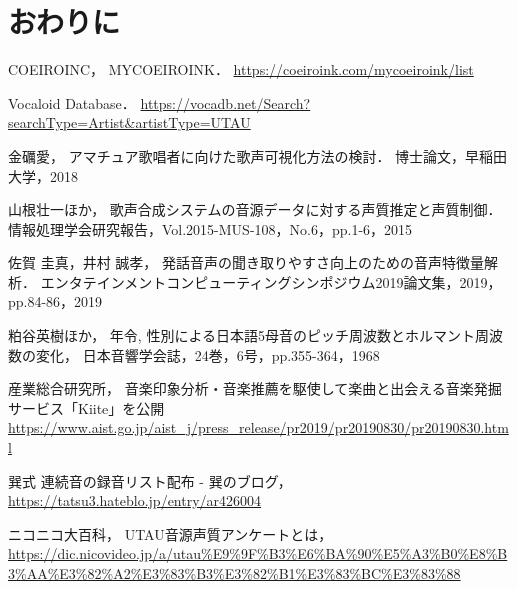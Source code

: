 \documentclass[a4j,8pt,twocolumn]{extarticle}
\begin{document}
\section{おわりに}

\begin{thebibliography}{9}
COEIROINC，
MYCOEIROINK．
\url{https://coeiroink.com/mycoeiroink/list}

Vocaloid Database．
\url{https://vocadb.net/Search?searchType=Artist&artistType=UTAU}

金礪愛，
アマチュア歌唱者に向けた歌声可視化方法の検討．
博士論文，早稲田大学，2018

山根壮一ほか，
歌声合成システムの音源データに対する声質推定と声質制御．
情報処理学会研究報告，Vol.2015-MUS-108，No.6，pp.1-6，2015

佐賀 圭真，井村 誠孝，
発話音声の聞き取りやすさ向上のための音声特徴量解析．
エンタテインメントコンピューティングシンポジウム2019論文集，2019，pp.84-86，2019

粕谷英樹ほか，
年令, 性別による日本語5母音のピッチ周波数とホルマント周波数の変化，
日本音響学会誌，24巻，6号，pp.355-364，1968

産業総合研究所，
音楽印象分析・音楽推薦を駆使して楽曲と出会える音楽発掘サービス「Kiite」を公開
\url{https://www.aist.go.jp/aist_j/press_release/pr2019/pr20190830/pr20190830.html}

巽式 連続音の録音リスト配布 - 巽のブログ，
\url{https://tatsu3.hateblo.jp/entry/ar426004}

ニコニコ大百科，
UTAU音源声質アンケートとは，
\url{https://dic.nicovideo.jp/a/utau%E9%9F%B3%E6%BA%90%E5%A3%B0%E8%B3%AA%E3%82%A2%E3%83%B3%E3%82%B1%E3%83%BC%E3%83%88}

\end{thebibliography}


\end{document}
